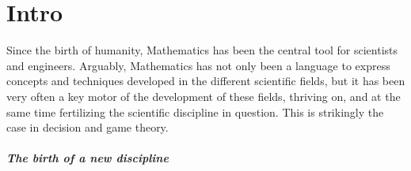 \ifx \globalmark \undefined %
	
\else

\fi



\chapter*{Intro}
Since the birth of humanity, Mathematics has been the central tool for scientists and engineers.  Arguably, Mathematics has not only been a language to express concepts and techniques developed in the different scientific fields, but it has been very often a key motor of the development of these fields, thriving on, and at the same time fertilizing the scientific discipline in question.  This is strikingly the case in decision and game theory.

\paragraph{The birth of a new discipline}

